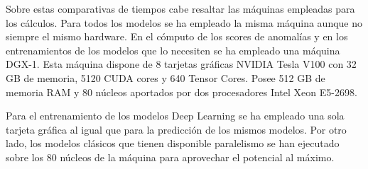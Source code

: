 Sobre estas comparativas de tiempos cabe resaltar las máquinas empleadas para los cálculos. Para todos los modelos se ha empleado la misma máquina aunque no siempre el mismo hardware. En el cómputo de los scores de anomalías y en los entrenamientos de los modelos que lo necesiten se ha empleado una máquina DGX-1. Esta máquina dispone de 8 tarjetas gráficas NVIDIA Tesla V100 con 32 GB de memoria, 5120 CUDA cores y 640 Tensor Cores. Posee 512 GB de memoria RAM y 80 núcleos aportados por dos procesadores Intel Xeon E5-2698.

Para el entrenamiento de los modelos Deep Learning se ha empleado una sola tarjeta gráfica al igual que para la predicción de los mismos modelos. Por otro lado, los modelos clásicos que tienen disponible paralelismo se han ejecutado sobre los 80 núcleos de la máquina para aprovechar el potencial al máximo.